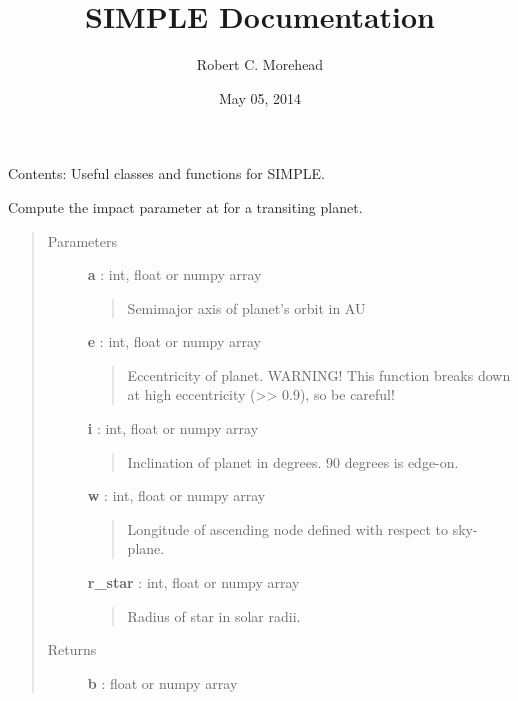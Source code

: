 \documentclass[letterpaper,10pt,english]{sphinxmanual}
\title{SIMPLE Documentation}
\date{May 05, 2014}
\author{Robert C. Morehead}
\begin{document}
\maketitle
\tableofcontents
{}\label{index::doc}


Contents:
\label{index:module-simple_lib}
Useful classes and functions for SIMPLE.

\begin{fulllineitems}
\label{index:simple_lib.impact_parameter}
Compute the impact parameter at for a transiting planet.
\begin{quote}\begin{description}
\item[{Parameters}] \leavevmode
\textbf{a} : int, float or numpy array
\begin{quote}

Semimajor axis of planet's orbit in AU
\end{quote}

\textbf{e} : int, float or numpy array
\begin{quote}

Eccentricity of planet. WARNING! This function breaks down at
high eccentricity (\textgreater{}\textgreater{} 0.9), so be careful!
\end{quote}

\textbf{i} : int, float or numpy array
\begin{quote}

Inclination of planet in degrees. 90 degrees is edge-on.
\end{quote}

\textbf{w} : int, float or numpy array
\begin{quote}

Longitude of ascending node defined with respect to sky-plane.
\end{quote}

\textbf{r\_star} : int, float or numpy array
\begin{quote}

Radius of star in solar radii.
\end{quote}

\item[{Returns}] \leavevmode
\textbf{b} : float or numpy array
\begin{quote}


\end{quote}
\end{description}
\end{quote}
\end{fulllineitems}
\end{document}
